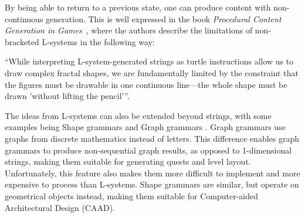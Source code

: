 By being able to return to a previous state, one can produce content with non-continuous generation.
This is well expressed in the book \textit{Procedural Content Generation in Games}~\cite[p.77]{PCG_in_games}, where the authors describe the limitations of non-bracketed L-systems in the following way:
\begin{center}
“While interpreting L-system-generated strings as turtle instructions allow us to draw complex fractal shapes, we are fundamentally limited by the constraint that the figures must be drawable in one continuous line—the whole shape must be drawn 'without lifting the pencil'”. 
\end{center}

The ideas from L-systems can also be extended beyond strings, with some examples being Shape grammars \cite{shape_grammars} and Graph grammars \cite{graph_grammars}.
Graph grammars use graphs from discrete mathematics instead of letters.
This difference enables graph grammars to produce non-sequential graph results, as opposed to 1-dimensional strings, making them suitable for generating quests and level layout.
Unfortunately, this feature also makes them more difficult to implement and more expensive to process than L-systems.
Shape grammars are similar, but operate on geometrical objects instead, making them suitable for Computer-aided Architectural Design (CAAD).